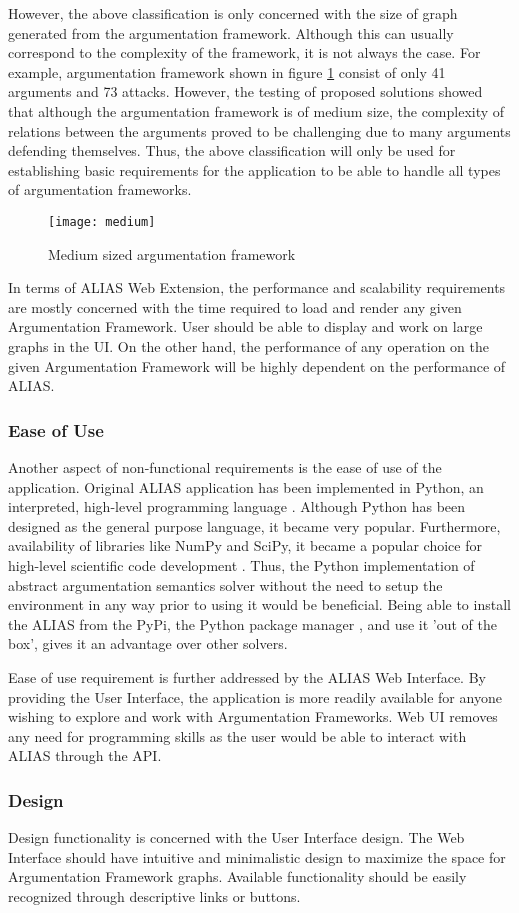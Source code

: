 However, the above classification is only concerned with the size of graph generated from the argumentation framework. Although this can usually correspond to the complexity of the framework, it is not always the case. For example, argumentation framework shown in figure \ref{fig:mediumAF} consist of only 41 arguments and 73 attacks. However, the testing of proposed solutions showed that although the argumentation framework is of medium size, the complexity of relations between the arguments proved to be challenging due to many arguments defending themselves. Thus, the above classification will only be used for establishing basic requirements for the application to be able to handle all types of argumentation frameworks. 

\begin{figure}[h]
	\texttt{[image: medium]}
	\caption{Medium sized argumentation framework}
	\label{fig:mediumAF}
\end{figure}

In terms of ALIAS Web Extension, the performance and scalability requirements are mostly concerned with the time required to load and render any given Argumentation Framework. User should be able to display and work on large graphs in the UI. On the other hand, the performance of any operation on the given Argumentation Framework will be highly dependent on the performance of ALIAS.

\subsubsection{Ease of Use}

Another aspect of non-functional requirements is the ease of use of the application. Original ALIAS application has been implemented in Python, an interpreted, high-level programming language \citep{millman2011python}. Although Python has been designed as the general purpose language, it became very popular. Furthermore, availability of libraries like NumPy and SciPy, it became a popular choice for high-level scientific code development \citep{perez2011python}. Thus, the Python implementation of abstract argumentation semantics solver without the need to setup the environment in any way prior to using it would be beneficial. Being able to install the ALIAS from the PyPi, the Python package manager \citep{pypi}, and use it 'out of the box', gives it an advantage over other solvers.

Ease of use requirement is further addressed by the ALIAS Web Interface. By providing the User Interface, the application is more readily available for anyone wishing to explore and work with Argumentation Frameworks. Web UI removes any need for programming skills as the user would be able to interact with ALIAS through the API.

\subsubsection{Design} 
Design functionality is concerned with the User Interface design. The Web Interface should have intuitive and minimalistic design to maximize the space for Argumentation Framework graphs. Available functionality should be easily recognized through descriptive links or buttons.